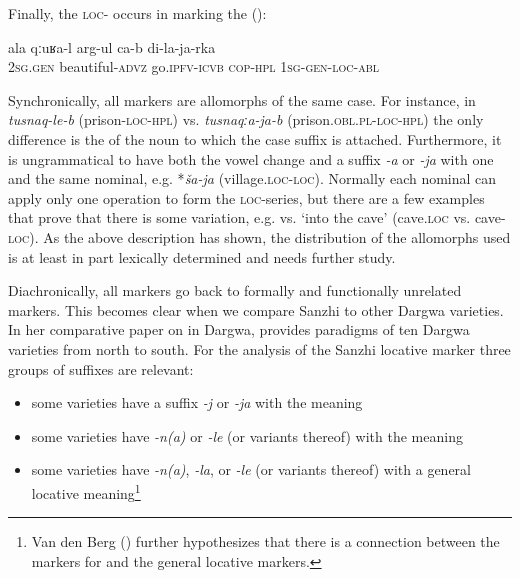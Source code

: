 Finally, the \textsc{loc}- occurs in   marking the  ():
%
\begin{exe}
	\ex	\label{ex:Yours (i.e. your story) is better than mine}
	\gll	ala	qːuʁa-l	arg-ul ca-b	di-la-ja-rka \\
		2\textsc{sg}.\textsc{gen}	beautiful-\textsc{advz}	go.\textsc{ipfv}-\textsc{icvb} \textsc{cop-hpl}	1\textsc{sg}-\textsc{gen}-\textsc{loc}-\textsc{abl}\\
	\glt	{}
\end{exe}


Synchronically, all markers are allomorphs of the same case. For instance, in \textit{tusnaq-le-b} (prison-\textsc{loc-hpl})  vs. \textit{tusnaqːa-ja-b} (prison.\textsc{obl.pl-loc-hpl})  the only difference is the  of the noun to which the case suffix is attached. Furthermore, it is ungrammatical to have both the vowel change and a suffix \textit{-a} or \textit{-ja} with one and the same nominal, e.g. *\textit{ša-ja} (village.\textsc{loc-loc}). Normally each nominal can apply only one operation to form the \textsc{loc}-series, but there are a few examples that prove that there is some variation, e.g.  vs.  `into the cave' (cave.\textsc{loc} vs. cave-\textsc{loc}). As the above description has shown, the distribution of the allomorphs used is at least in part lexically determined and needs further study.
 
Diachronically, all markers go back to formally and functionally unrelated markers. This becomes clear when we compare Sanzhi to other Dargwa varieties. In her comparative paper on  in Dargwa, \citet{vandenBerg2003c} provides  paradigms of ten Dargwa varieties from north to south. For the analysis of the Sanzhi locative marker three groups of suffixes are relevant:
%
\begin{itemize}
	\item some varieties have a suffix \textit{-j} or \textit{-ja} with the meaning 
	\item some varieties have \textit{-n(a)} or \textit{-le} (or variants thereof) with the meaning 
	\item some varieties have \textit{-n(a)}, \textit{-la}, or \textit{-le} (or variants thereof) with a general locative meaning\footnote{Van den Berg (\citeyear{vandenBerg2003c}) further hypothesizes that there is a connection between the markers for  and the general locative markers.} 
\end{itemize}


